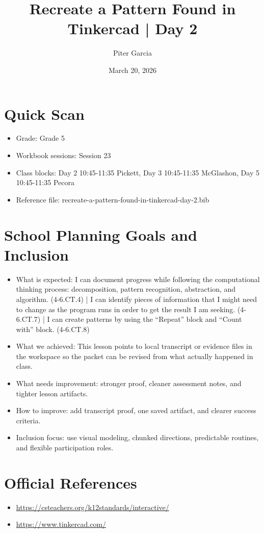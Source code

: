 \documentclass[11pt]{article}
\title{Recreate a Pattern Found in Tinkercad | Day 2}
\author{Piter Garcia}
\date{March 20, 2026}
\begin{document}
    \maketitle
    \section*{Quick Scan}
    \begin{itemize}[leftmargin=*]
    \item Grade: Grade 5
    \item Workbook sessions: Session 23
    \item Class blocks: Day 2 10:45-11:35 Pickett, Day 3 10:45-11:35 McGlashon, Day 5 10:45-11:35 Pecora
    \item Reference file: recreate-a-pattern-found-in-tinkercad-day-2.bib
    \end{itemize}
    \section*{School Planning Goals and Inclusion}
    \begin{itemize}[leftmargin=*]
    \item What is expected: I can document progress while following the computational thinking process: decomposition, pattern recognition, abstraction, and algorithm. (4-6.CT.4) | I can identify pieces of information that I might need to change as the program runs in order to get the result I am seeking. (4-6.CT.7) | I can create patterns by using the “Repeat” block and “Count with” block. (4-6.CT.8)
    \item What we achieved: This lesson points to local transcript or evidence files in the workspace so the packet can be revised from what actually happened in class.
    \item What needs improvement: stronger proof, cleaner assessment notes, and tighter lesson artifacts.
    \item How to improve: add transcript proof, one saved artifact, and clearer success criteria.
    \item Inclusion focus: use visual modeling, chunked directions, predictable routines, and flexible participation roles.
    \end{itemize}
    \section*{Official References}
    \begin{itemize}[leftmargin=*]
    \item \url{https://csteachers.org/k12standards/interactive/}
\item \url{https://www.tinkercad.com/}

    \end{itemize}
    
\end{document}
